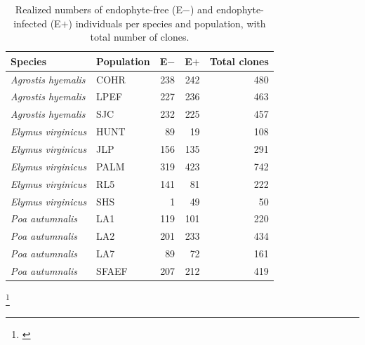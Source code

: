 \documentclass[12pt]{article}\usepackage[]{graphicx}\usepackage[dvipsnames]{xcolor}
\newcommand{\tom}[2]{{\color{red}{#1}}\footnote{\textit{\color{red}{#2}}}}
\begin{document}
{\begin{table}[h]
\centering
\caption{Realized numbers of endophyte-free (E$-$) and endophyte-infected (E$+$) individuals per species and population, with total number of clones.}
\begin{tabular}{llrrr}
\toprule
\textbf{Species} & \textbf{Population} & \textbf{E$-$} & \textbf{E$+$} & \textbf{Total clones} \\
\midrule
\textit{Agrostis hyemalis} & COHR  & 238 & 242 & 480 \\
\textit{Agrostis hyemalis} & LPEF  & 227 & 236 & 463 \\
\textit{Agrostis hyemalis} & SJC   & 232 & 225 & 457 \\
\textit{Elymus virginicus} & HUNT  & 89  & 19  & 108 \\
\textit{Elymus virginicus} & JLP   & 156 & 135 & 291 \\
\textit{Elymus virginicus} & PALM  & 319 & 423 & 742 \\
\textit{Elymus virginicus} & RL5   & 141 & 81  & 222 \\
\textit{Elymus virginicus} & SHS   & 1   & 49  & 50  \\
\textit{Poa autumnalis}     & LA1   & 119 & 101 & 220 \\
\textit{Poa autumnalis}     & LA2   & 201 & 233 & 434 \\
\textit{Poa autumnalis}     & LA7   & 89  & 72  & 161 \\
\textit{Poa autumnalis}     & SFAEF & 207 & 212 & 419 \\
\bottomrule
\end{tabular}
\label{tab:endo_counts}
\end{table}
\tom{}{This table is redundant with the new table I added above, and can probably be dropped. But I have left it here because these numbers differ from what is in my table, and I am not sure why.}
\clearpage

}
\end{document}
